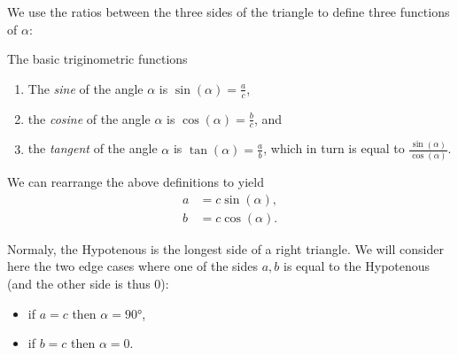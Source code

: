 \centering
{}
\flushleft

We use the ratios between the three sides of the triangle to define three functions of $\alpha$:
\begin{definition}{The basic triginometric functions}{}
	\vspace{5mm}
	\begin{enumerate}
		\item The \emph{sine} of the angle $\alpha$ is $\sin(\alpha)=\frac{a}{c}$,
		\item the \emph{cosine} of the angle $\alpha$ is $\cos(\alpha)=\frac{b}{c}$, and
		\item the \emph{tangent} of the angle $\alpha$ is $\tan(\alpha)=\frac{a}{b}$, which in turn is equal to $\frac{\sin(\alpha)}{\cos(\alpha)}$.
		\end{enumerate}
	\label{def:basic_trig}
\end{definition}

We can rearrange the above definitions to yield
\begin{align}
	a &= c\sin(\alpha),\nonumber\\
	b &= c\cos(\alpha).
	\label{eq:basic_trig_rearrange}
\end{align}

Normaly, the Hypotenous is the longest side of a right triangle. We will consider here the two edge cases where one of the sides $a,b$ is equal to the Hypotenous (and the other side is thus $0$):
\begin{itemize}
	\item if $a=c$ then $\alpha=\ang{90}$,\
	\item if $b=c$ then $\alpha=0$.
\end{itemize}

